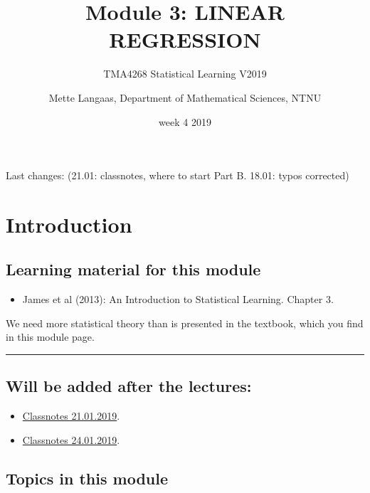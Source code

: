 \documentclass[]{article}
\title{Module 3: LINEAR REGRESSION}
\subtitle{TMA4268 Statistical Learning V2019}
\author{Mette Langaas, Department of Mathematical Sciences, NTNU}
\date{week 4 2019}
\providecommand{\tightlist}{%
  \setlength{\itemsep}{0pt}\setlength{\parskip}{0pt}}
\begin{document}
\maketitle

{
\setcounter{tocdepth}{2}
\tableofcontents
}
Last changes: (21.01: classnotes, where to start Part B. 18.01: typos
corrected)

\hypertarget{introduction}{%
\section{Introduction}\label{introduction}}

\hypertarget{learning-material-for-this-module}{%
\subsection{Learning material for this
module}\label{learning-material-for-this-module}}

\begin{itemize}
\tightlist
\item
  James et al (2013): An Introduction to Statistical Learning. Chapter
  3.
\end{itemize}

We need more statistical theory than is presented in the textbook, which
you find in this module page.

\begin{center}\rule{0.5\linewidth}{\linethickness}\end{center}

\hypertarget{will-be-added-after-the-lectures}{%
\subsection{Will be added after the
lectures:}\label{will-be-added-after-the-lectures}}

\begin{itemize}
\tightlist
\item
  \href{https://www.math.ntnu.no/emner/TMA4268/2019v/notes/M3L1notes.pdf}{Classnotes
  21.01.2019}.
\item
  \href{https://www.math.ntnu.no/emner/TMA4268/2019v/notes/M3L2notes.pdf}{Classnotes
  24.01.2019}.
\end{itemize}

\hypertarget{topics-in-this-module}{%
\subsection{Topics in this module}\label{topics-in-this-module}}
\end{document}
